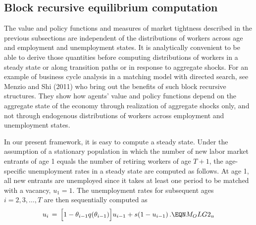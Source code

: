 \subsection{Block recursive equilibrium computation}
%
The value and policy functions and measures
of market tightness described in the previous subsections are independent
of the distributions of workers across age and employment and
unemployment states. It is analytically convenient to be able
to derive those quantities before  computing
distributions of workers in a steady state or along transition paths  or  in response to aggregate shocks.
For an example of
business cycle analysis in a matching model with directed
search, see Menzio and Shi (2011) who bring out the benefits  of such block recursive structures.
They show how agents' value and policy functions
depend on the aggregate state of the economy
through realization of aggregate shocks only, and not
through endogenous distributions of workers across
employment and unemployment states.

In  our present framework, it is  easy to
compute a steady state. Under the assumption of a stationary
population in which the number of new labor market
entrants of age 1 equals the number of retiring  workers of
age $T+1$, the age-specific unemployment rates in a steady
state are computed as follows. At age 1, all new entrants
are unemployed since it takes at least one period to be
matched with a vacancy, $u_1=1$. The unemployment rates for
subsequent ages $i=2, 3, \ldots, T$ are then sequentially
computed as
$$
u_i \,=\, \Bigl[1 - \theta_{i-1} q(\theta_{i-1}) \Bigr] u_{i-1}
         + s (1-u_{i-1}) \,.                      \EQN M_OLG2_u
$$

